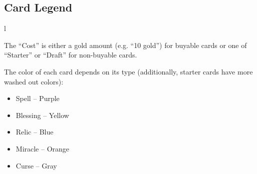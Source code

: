 \documentclass[dvipsnames,parskip,a4paper]{scrartcl}
\begin{document}
\subsection*{Card Legend}

\begin{wrapfigure}{l}{}
\end{wrapfigure}

The ``Cost'' is either a gold amount (e.g. ``10 gold'') for buyable cards or one of ``Starter'' or ``Draft'' for non-buyable cards.

The color of each card depends on its type (additionally, starter cards have more washed out colors):
\begin{itemize}
\item Spell -- \colorbox{spellcolor}{Purple}
\item Blessing -- \colorbox{blessingcolor}{Yellow}
\item Relic -- \colorbox{reliccolor}{Blue}
\item Miracle -- \colorbox{miraclecolor}{Orange}
\item Curse -- \colorbox{cursecolor}{Gray}
\end{itemize}
\end{document}
